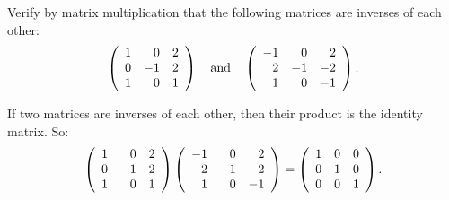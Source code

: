 \documentclass{ximera}
\begin{document}
\begin{exercise} \label{c4.8.1}
Verify by matrix multiplication that the following matrices are inverses
of each other:
\[
\left( \begin{array}{rrr}
1  &  0  &  2\\
0  & -1  &  2\\
1  &  0  &  1
\end{array} \right)\quad\mbox{and}\quad
\left( \begin{array}{rrr}
-1 &   0 &   2\\
 2 &  -1 &  -2\\
 1 &   0 &  -1
\end{array} \right).
\]

\begin{solution}

If two matrices are inverses of each other, then their product is the
identity matrix.  So:
\[ \left(\begin{array}{rrr} 1 & 0 & 2 \\ 0 & -1 & 2 \\ 1 & 0 & 1\end{array}\right)
\left(\begin{array}{rrr} -1 & 0 & 2 \\ 2 & -1 & -2 \\ 1 & 0 & -1\end{array}\right) =
\left(\begin{array}{rrr} 1 & 0 & 0 \\ 0 & 1 & 0 \\ 0 & 0 & 1\end{array}\right). \]

\end{solution}
\end{exercise}
\end{document}
